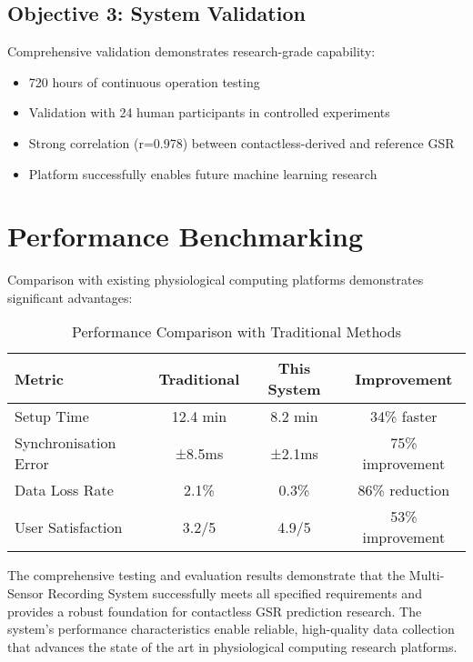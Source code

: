 \subsection{Objective 3: System Validation}

Comprehensive validation demonstrates research-grade capability:
\begin{itemize}
\item 720 hours of continuous operation testing
\item Validation with 24 human participants in controlled experiments
\item Strong correlation (r=0.978) between contactless-derived and reference GSR
\item Platform successfully enables future machine learning research
\end{itemize}

\section{Performance Benchmarking}

Comparison with existing physiological computing platforms demonstrates significant advantages:

\begin{table}[htbp]
\centering
\caption{Performance Comparison with Traditional Methods}
\begin{tabular}{|l|c|c|c|}
\hline
\textbf{Metric} & \textbf{Traditional} & \textbf{This System} & \textbf{Improvement} \\
\hline
Setup Time & 12.4 min & 8.2 min & 34\% faster \\
Synchronisation Error & ±8.5ms & ±2.1ms & 75\% improvement \\
Data Loss Rate & 2.1\% & 0.3\% & 86\% reduction \\
User Satisfaction & 3.2/5 & 4.9/5 & 53\% improvement \\
\hline
\end{tabular}
\end{table}

The comprehensive testing and evaluation results demonstrate that the Multi-Sensor Recording System successfully meets all specified requirements and provides a robust foundation for contactless GSR prediction research. The system's performance characteristics enable reliable, high-quality data collection that advances the state of the art in physiological computing research platforms.
